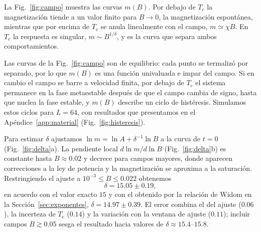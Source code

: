 \documentclass[a4paper,11pt]{article}
\newcommand{\Tc}{T_c}
\begin{document}
La Fig.~\ref{fig:campo} muestra las curvas $m(B)$.
Por debajo de $\Tc$ la magnetización tiende a un valor finito para $B \to 0$, la magnetización espontánea, mientras que por encima de $\Tc$ se anula linealmente con el campo, $m \simeq \chi B$.
En $\Tc$ la respuesta es singular, $m \sim B^{1/\delta}$, y es la curva que separa ambos comportamientos.

Las curvas de la Fig.~\ref{fig:campo} son de equilibrio: cada punto se termalizó por separado, por lo que $m(B)$ es una función univaluada e impar del campo.
Si en cambio el campo se barre a velocidad finita, por debajo de $\Tc$ el sistema permanece en la fase metaestable después de que el campo cambia de signo, hasta que nuclea la fase estable, y $m(B)$ describe un ciclo de histéresis.
Simulamos estos ciclos para $L = 64$, con resultados que presentamos en el Apéndice~\ref{app:material} (Fig.~\ref{fig:histeresis}).

Para estimar $\delta$ ajustamos $\ln m = \ln A + \delta^{-1} \ln B$ a la curva de $t = 0$ (Fig.~\ref{fig:delta}a).
La pendiente local $d\ln m/d\ln B$ (Fig.~\ref{fig:delta}b) es constante hasta $B \approx 0.02$ y decrece para campos mayores, donde aparecen correcciones a la ley de potencia y la magnetización se aproxima a la saturación.
Restringiendo el ajuste a $10^{-3} \leq B \leq 0.022$ obtenemos
\begin{equation}
  \delta = 15.05 \pm 0.19 ,
\end{equation}
en acuerdo con el valor exacto $15$ y con el obtenido por la relación de Widom en la Sección~\ref{sec:exponentes}, $\delta = 14.97 \pm 0.39$.
El error combina el del ajuste ($0.06$), la incerteza de $\Tc$ ($0.14$) y la variación con la ventana de ajuste ($0.11$); incluir campos $B \gtrsim 0.05$ sesga el resultado hacia valores de $\delta \approx 15.4$--$15.8$.
\end{document}
